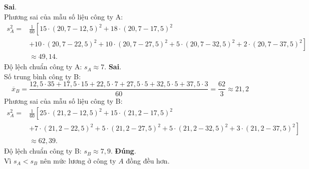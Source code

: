 \begin{ex}
{\begin{itemchoice}
			\itemch \textbf{Sai}.\\
			Phương sai của mẫu số liệu công ty A:
			$$
			\begin{aligned}
				s^2_A  =&\frac{1}{60}\left[15\cdot(20{,}7-12{,}5)^2+18\cdot(20{,}7-17{,}5)^2\right. \\
				& +10\cdot(20{,}7-22{,}5)^2+10\cdot(20{,}7-27{,}5)^2+5\cdot(20{,}7-32{,}5)^2+2\cdot(20{,}7-37{,}5)^2 \left. \right]\\
				&  \approx 49{,}14.
			\end{aligned}
			$$
			Độ lệch chuẩn công ty A: $s_A\approx 7$.
			\itemch \textbf{Sai}.\\
			Số trung bình công ty B:
			$$\overline{x}_B=\dfrac{12,5\cdot 35+17{,}5\cdot 15+22{,}5\cdot 7+27{,}5\cdot 5+32{,}5\cdot 5+37{,}5\cdot 3}{60}=\dfrac{62}{3}\approx 21{,}2$$
			Phương sai của mẫu số liệu công ty B:
			$$
			\begin{aligned}
				s^2_A  =&\frac{1}{60}\left[25\cdot(21{,}2-12{,}5)^2+15\cdot(21{,}2-17{,}5)^2\right. \\
				& +7\cdot(21{,}2-22{,}5)^2+5\cdot(21{,}2-27{,}5)^2+5\cdot(21{,}2-32{,}5)^2+3\cdot(21{,}2-37{,}5)^2 \left. \right]\\
				&  \approx 62{,}39.
			\end{aligned}
			$$
			Độ lệch chuẩn công ty B: $s_B\approx 7{,}9$.
			\itemch \textbf{Đúng}.\\
			Vì $s_A<s_B$ nên mức lương ở công ty $A$ đồng đều hơn.
		\end{itemchoice}	
	}
\end{ex}

